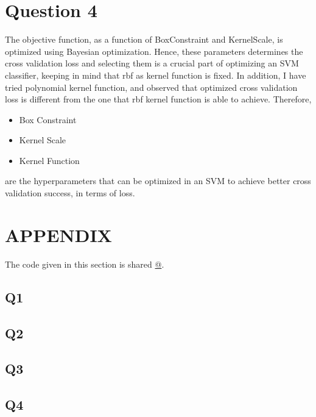 \documentclass[11pt]{extarticle}
\begin{document}
\pagebreak

\section{Question 4}

The objective function, as a function of BoxConstraint and KernelScale, is optimized using Bayesian optimization.
Hence, these parameters determines the cross validation loss and selecting them is a crucial part of optimizing an
SVM classifier, keeping in mind that rbf as kernel function is fixed. In addition, I have tried polynomial kernel
function, and observed that optimized cross validation loss is different from the one that rbf kernel function is
able to achieve. Therefore,
\begin{itemize}
    \item Box Constraint
    \item Kernel Scale
    \item Kernel Function
\end{itemize}
are the hyperparameters that can be optimized in an SVM to achieve better cross validation success, in terms of loss.

\pagebreak
\section{APPENDIX}
The code given in this section is shared \href{https://github.com/kutay-ugurlu/Pattern-Recognition/tree/master/HW3}{@\faGithubSquare}.
\subsection{Q1}\label{subsec:Q1_code}

\pagebreak
\subsection{Q2} \label{subsec:Q2_code}

\pagebreak
\subsection{Q3}\label{subsec:Q3_code}

\pagebreak
\subsection{Q4}\label{subsec:Q4_code}

\end{document}

